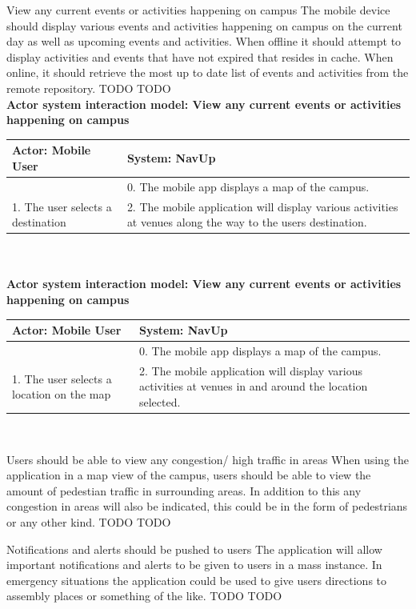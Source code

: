 \FuncReq
{View any current events or activities happening on campus}
{The mobile device should display various events and activities happening on campus on the current day as well as upcoming events and activities. When offline it should attempt to display activities and events that have not expired that resides in cache. When online, it should retrieve the most up to date list of events and activities from the remote repository.}
{TODO}
{TODO}
	\\
    \textbf{Actor system interaction model: View any current events or activities happening on campus }\\
    \begin{tabular}{ | p{6cm} | p{6cm} |}
    \hline
    Actor: Mobile User & System: NavUp \\ \hline
    & 0. The mobile app displays a map of the campus.\\ \hline
    1. The user selects a destination & 2. The mobile application will display various activities at venues along the way to the users destination.
    \\ \hline
    \end{tabular}
\\
\bigskip
	\\
    \textbf{Actor system interaction model: View any current events or activities happening on campus }\\
    \begin{tabular}{ | p{6cm} | p{6cm} |}
    \hline
    Actor: Mobile User & System: NavUp \\ \hline
    & 0. The mobile app displays a map of the campus.\\ \hline
    1. The user selects a location on the map & 2. The mobile application will display various activities at venues in and around the location selected.\\ \hline
    \end{tabular}
\\
\bigskip


\FuncReq
{Users should be able to view any congestion/ high traffic in areas}
{When using the application in a map view of the campus, users should be able to view the amount of pedestian traffic in surrounding areas. In addition to this any congestion in areas will also be indicated, this could be in the form of pedestrians or any other kind.}
{TODO}
{TODO}

\FuncReq
{Notifications and alerts should be pushed to users}
{The application will allow important notifications and alerts to be given to users in a mass instance. In emergency situations the application could be used to give users directions to assembly places or something of the like.}
{TODO}
{TODO}
